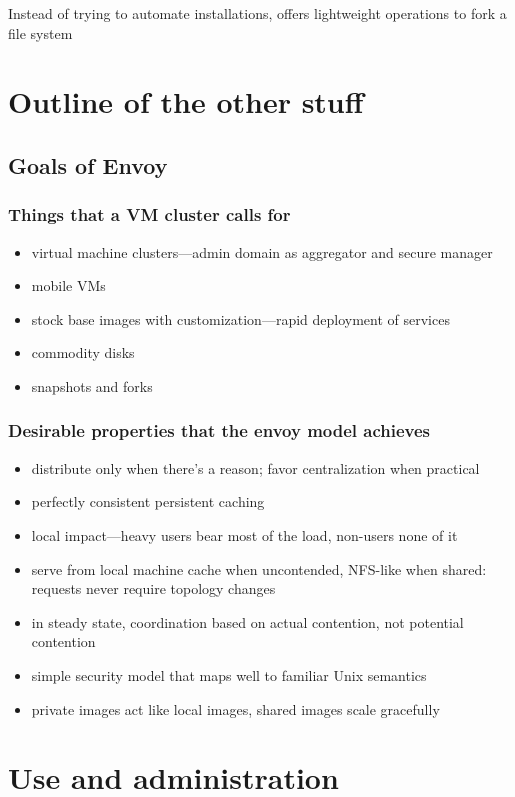 Instead of trying to automate installations, \envoy offers lightweight operations to fork a file system 

\section{Outline of the other stuff}
\subsection{Goals of Envoy}
\subsubsection{Things that a VM cluster calls for}
\begin{itemize}
\item virtual machine clusters---admin domain as aggregator and secure manager
\item mobile VMs
\item stock base images with customization---rapid deployment of services
\item commodity disks
\item snapshots and forks
\end{itemize}

\subsubsection{Desirable properties that the envoy model achieves}
\begin{itemize}
\item distribute only when there's a reason; favor centralization when practical
\item perfectly consistent persistent caching
\item local impact---heavy users bear most of the load, non-users none of it
\item serve from local machine cache when uncontended, NFS-like when shared: requests never require topology changes
\item in steady state, coordination based on actual contention, not potential contention
\item simple security model that maps well to familiar Unix semantics
\item private images act like local images, shared images scale gracefully
\end{itemize}

\section{Use and administration}

